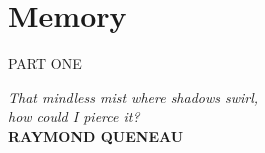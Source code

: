 

\chapter*{Memory}


\begin{center}
\vspace*{\fill}
\Huge{PART ONE}

\vspace{2cm}

\begin{flushright}
\large{
\textit{That mindless mist where shadows swirl,\\
how could I pierce it?}\\
\textbf{RAYMOND QUENEAU}}
\end{flushright}

\vspace*{\fill}
\end{center}

